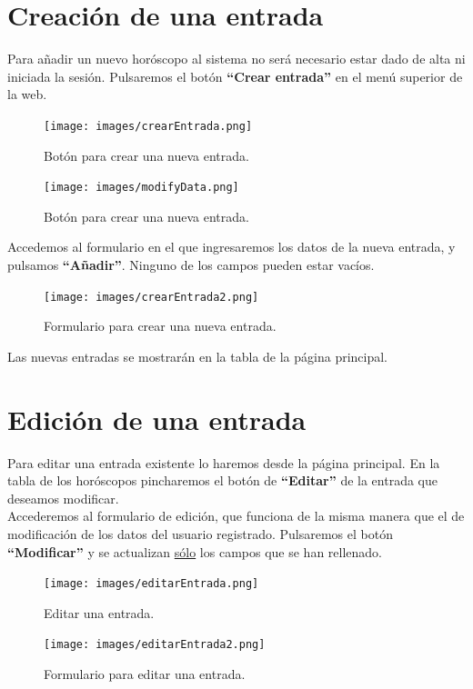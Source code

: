\documentclass[12pt, twoside]{report}
\begin{document}
\section*{Creación de una entrada}
\noindent Para añadir un nuevo horóscopo al sistema no será necesario estar dado de alta ni iniciada la sesión. Pulsaremos el botón \textbf{``Crear entrada''} en el menú superior de la web.
\begin{figure}[h]
\begin{center}
\texttt{[image: images/crearEntrada.png]}
\end{center}
\caption{\label{inicio} Botón para crear una nueva entrada.}
\end{figure}
\begin{figure}[h]
\begin{center}
\texttt{[image: images/modifyData.png]}
\end{center}
\caption{\label{inicio} Botón para crear una nueva entrada.}
\end{figure}
\newline
Accedemos al formulario en el que ingresaremos los datos de la nueva entrada, y pulsamos \textbf{``Añadir''}. Ninguno de los campos pueden estar vacíos.
\begin{figure}[h]
\begin{center}
\texttt{[image: images/crearEntrada2.png]}
\end{center}
\caption{\label{inicio} Formulario para crear una nueva entrada.}
\end{figure}
\newline
Las nuevas entradas se mostrarán en la tabla de la página principal.
\clearpage

\section*{Edición de una entrada}
\noindent Para editar una entrada existente lo haremos desde la página principal. En la tabla de los horóscopos pincharemos el botón de \textbf{``Editar''} de la entrada que deseamos modificar.\\
Accederemos al formulario de edición, que funciona de la misma manera que el de modificación de los datos del usuario registrado. Pulsaremos el botón \textbf{``Modificar''} y se actualizan \underline{sólo} los campos que se han rellenado.
\begin{figure}[h]
\begin{center}
\texttt{[image: images/editarEntrada.png]}
\end{center}
\caption{\label{inicio} Editar una entrada.}
\end{figure}
\begin{figure}[h]
\begin{center}
\texttt{[image: images/editarEntrada2.png]}
\end{center}
\caption{\label{inicio} Formulario para editar una entrada.}
\end{figure}
\clearpage
\end{document}
